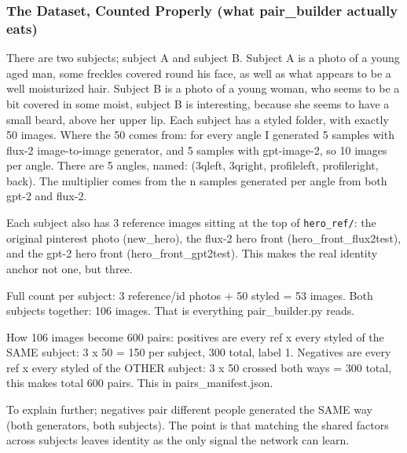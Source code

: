 \documentclass[conference]{IEEEtran}
\begin{document}
\subsubsection{The Dataset, Counted Properly (what pair\_builder actually eats)}
There are two subjects; subject A and subject B. Subject A is a photo of a young aged man, some freckles covered round his face, as well as what appears to be a well moisturized hair.
Subject B is a photo of a young woman, who seems to be a bit covered in some moist, subject B is interesting, because she seems to have a small beard, above her upper lip. Each subject has a styled folder, with exactly 50 images. Where the 50 comes from: for every angle I generated 5 samples with flux-2 image-to-image generator, and 5 samples with gpt-image-2, so 10 images per angle. There are 5 angles, named: (3qleft, 3qright, profileleft, profileright, back).
The multiplier comes from the n samples generated per angle from both gpt-2 and flux-2.

Each subject also has 3 reference images sitting at the top of \texttt{hero\_ref/}: the original pinterest photo (new\_hero), the flux-2 hero front (hero\_front\_flux2test), and the gpt-2 hero front (hero\_front\_gpt2test). This makes the real identity anchor not one, but three.

Full count per subject: 3 reference/id photos + 50 styled = 53 images. Both subjects together: 106 images. That is everything pair\_builder.py reads.

How 106 images become 600 pairs: positives are every ref x every styled of the SAME subject: 3 x 50 = 150 per subject, 300 total, label 1. Negatives are every ref x every styled of the OTHER subject: 3 x 50 crossed both ways = 300 total, this makes total 600 pairs. This in pairs\_manifest.json.

To explain further; negatives pair different people generated the SAME way (both generators, both subjects). The point is that matching the shared factors across subjects leaves identity as the only signal the network can learn.
\end{document}
